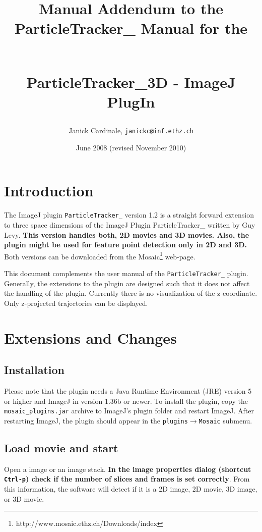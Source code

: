 \documentclass{scrartcl}
\title{\begin{normalsize}Manual Addendum to the ParticleTracker\_ Manual for the\end{normalsize} \\ ParticleTracker\_3D - ImageJ PlugIn}
\date{June 2008 (revised November 2010)}
\author{Janick Cardinale, \texttt{janickc@inf.ethz.ch}}
\begin{document}
\maketitle

\section{Introduction}
\label{sec:intro}
The ImageJ plugin \texttt{ParticleTracker\_} version 1.2 is a straight forward extension to three space dimensions of the ImageJ Plugin ParticleTracker\_ written by Guy Levy. \textbf{This version handles both, 2D movies and 3D movies. Also, the plugin might be used for feature point detection only in 2D and 3D.} Both versions can be downloaded from the Mosaic\footnote{http://www.mosaic.ethz.ch/Downloads/index} web-page. 

This document complements the user manual of the \texttt{ParticleTracker\_} plugin. Generally, the extensions to the plugin are designed such that it does not affect the handling of the plugin. Currently there is no visualization of the z-coordinate. Only z-projected trajectories can be displayed.

\section{Extensions and Changes}
\label{sec:pluginstart}
\subsection{Installation}
Please note that the plugin needs a Java Runtime Environment (JRE) version 5 or higher and ImageJ in version 1.36b or newer. To install the plugin, copy the \texttt{mosaic\_plugins.jar} archive to ImageJ's plugin folder and restart ImageJ. After restarting ImageJ, the plugin should appear in the \texttt{plugins$\rightarrow$Mosaic} submenu.

\subsection{Load movie and start}
Open a image or an image stack. \textbf{In the image properties dialog (shortcut \texttt{Ctrl-p}) check if the number of slices and frames is set correctly}. From this information, the software will detect if it is a 2D image, 2D movie, 3D image, or 3D movie.

\end{document}
